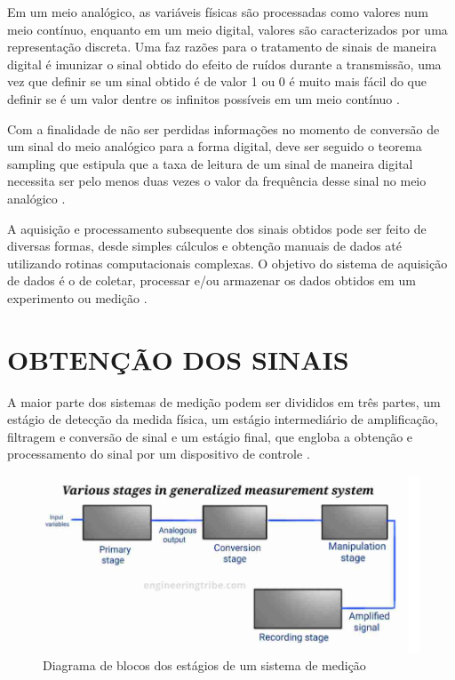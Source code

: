 Em um meio analógico, as variáveis físicas são processadas como valores num meio contínuo, enquanto em um meio digital, valores são caracterizados por uma representação discreta. Uma faz razões para o tratamento de sinais de maneira digital é imunizar o sinal obtido do efeito de ruídos durante a transmissão, uma vez que definir se um sinal obtido é de valor 1 ou 0 é muito mais fácil do que definir se é um valor dentre os infinitos possíveis em um meio contínuo \autocite{Hollman2011}.

Com a finalidade de não ser perdidas informações no momento de conversão de um sinal do meio analógico para a forma digital, deve ser seguido o teorema sampling que estipula que a taxa de leitura de um sinal de maneira digital necessita ser pelo menos duas vezes o valor da frequência desse sinal no meio analógico \autocite{Hollman2011}.

A aquisição e processamento subsequente dos sinais obtidos pode ser feito de diversas formas, desde simples cálculos e obtenção manuais de dados até utilizando  rotinas computacionais complexas. O objetivo do sistema de aquisição de dados é o de coletar, processar e/ou armazenar os dados obtidos em um experimento ou medição \autocite{Hollman2011}.

\section{OBTENÇÃO DOS SINAIS}

A maior parte dos sistemas de medição podem ser divididos em três partes, um estágio de detecção da medida física, um estágio intermediário de amplificação, filtragem e conversão de sinal e um estágio final, que engloba a obtenção e processamento do sinal por um dispositivo de controle \autocite{Hollman2011}.

\begin{figure}[htb]
	\caption{\label{fig:1130} Diagrama de blocos dos estágios de um sistema de medição}
	\begin{center}
		\includegraphics[width=\textwidth]{pictures/1130.png}
	\end{center}
\end{figure}


